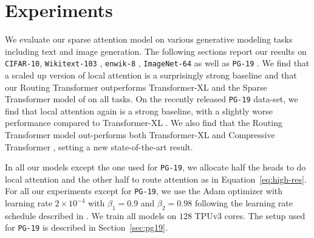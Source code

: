 \documentclass[a4paper]{article}
\begin{document}
\section{Experiments}\label{sec:experiments}
We evaluate our sparse attention model on various generative modeling tasks
including text and image generation. 
The following sections report our
results on \texttt{CIFAR-10}, \texttt{Wikitext-103} \citep{merity2016pointer},
\texttt{enwik-8} \citep{mahoney2011large}, \texttt{ImageNet-64} 
as well as \texttt{PG-19} \cite{rae2020compressive}. 
We find that a scaled up version of local attention is a surprisingly strong baseline
and that our Routing Transformer outperforms Transformer-XL 
\citep{dai2019transformer} and the Sparse Transformer model of
\citet{child2019generating} on all tasks. 
On the recently released \texttt{PG-19} data-set, 
we find that local attention again is a strong baseline,
with a slightly worse performance compared to Transformer-XL \citep{dai2019transformer}.
We also find that the Routing Transformer model out-performs both Transformer-XL 
\citep{dai2019transformer} and Compressive Transformer \citep{rae2020compressive}, setting a 
new state-of-the-art result. 

In all our models except the one used for \texttt{PG-19}, we allocate
half the heads to do local attention and the other half
to route attention as in Equation~\ref{eq:high-res}.
For all our experiments except for \texttt{PG-19},
we use the Adam optimizer \citep{adam} with learning rate \(2\times 10^{-4}\) with
\(\beta_1 = 0.9\) and \(\beta_2 = 0.98\) following the learning
rate schedule described in \citet{vaswani2017attention}. We train all models on \(128\) TPUv3 cores.
The setup used for \texttt{PG-19} is described in Section~\ref{sec:pg19}.
\end{document}
